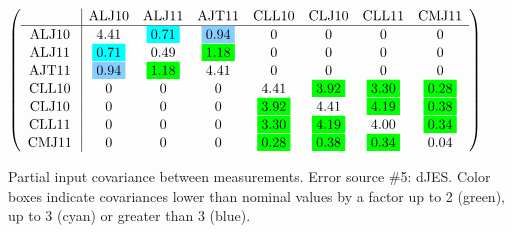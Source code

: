\begin{table}[H]
\scriptsize
\begin{center}
\renewcommand{\arraystretch}{1.1}
\begin{math}\left(\begin{array}{c|ccccccc}
 & \mathrm{ALJ10} & 
\mathrm{ALJ11} & 
\mathrm{AJT11} & 
\mathrm{CLL10} & 
\mathrm{CLJ10} & 
\mathrm{CLL11} & 
\mathrm{CMJ11} \\
\hline
\mathrm{ALJ10} \hspace*{2pt} &       4.41 &  \colorbox{Cyan1}{$      0.71$} &  \colorbox{SkyBlue1}{$      0.94$} &  0 &  0 &  0 &  0 \\
\mathrm{ALJ11} \hspace*{2pt} &  \colorbox{Cyan1}{$      0.71$} &       0.49 &  \colorbox{Green1}{$      1.18$} &  0 &  0 &  0 &  0 \\
\mathrm{AJT11} \hspace*{2pt} &  \colorbox{SkyBlue1}{$      0.94$} &  \colorbox{Green1}{$      1.18$} &       4.41 &  0 &  0 &  0 &  0 \\
\mathrm{CLL10} \hspace*{2pt} &  0 &  0 &  0 &       4.41 &  \colorbox{Green1}{$      3.92$} &  \colorbox{Green1}{$      3.30$} &  \colorbox{Green1}{$      0.28$} \\
\mathrm{CLJ10} \hspace*{2pt} &  0 &  0 &  0 &  \colorbox{Green1}{$      3.92$} &       4.41 &  \colorbox{Green1}{$      4.19$} &  \colorbox{Green1}{$      0.38$} \\
\mathrm{CLL11} \hspace*{2pt} &  0 &  0 &  0 &  \colorbox{Green1}{$      3.30$} &  \colorbox{Green1}{$      4.19$} &       4.00 &  \colorbox{Green1}{$      0.34$} \\
\mathrm{CMJ11} \hspace*{2pt} &  0 &  0 &  0 &  \colorbox{Green1}{$      0.28$} &  \colorbox{Green1}{$      0.38$} &  \colorbox{Green1}{$      0.34$} &       0.04 \\
\end{array}\right)\end{math}
\caption{Partial input covariance between measurements. Error source \#5: dJES. Color boxes indicate covariances lower than nominal values by a factor up to 2 (green), up to 3 (cyan) or greater than 3 (blue).}
\renewcommand{\arraystretch}{1}
\end{center}
\end{table}
